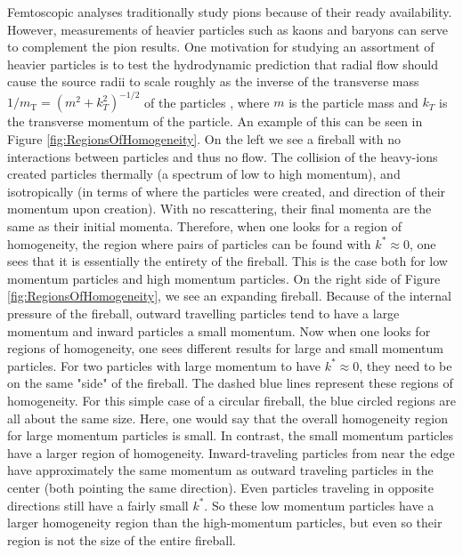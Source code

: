 Femtoscopic analyses traditionally study pions \cite{Goldhaber:1960sf,Aamodt:2011mr} because of their ready availability.  
However, measurements of heavier particles such as kaons \cite{Abelev:2012ms} and baryons \cite{Gos:2007cj} can serve to complement the pion results.  
One motivation for studying an assortment of heavier particles is to test the hydrodynamic prediction that radial flow should cause the source radii to scale roughly as the inverse of the transverse mass $1/m_{\mathrm{T}} = (m^2 + k^2_T)^{-1/2}$ of the particles \cite{Csorgo:1995bi,Lisa:2005dd}, where $m$ is the particle mass and $k_T$ is the transverse momentum of the particle.
An example of this can be seen in Figure \ref{fig:RegionsOfHomogeneity}.
On the left we see a fireball with no interactions between particles and thus no flow.
The collision of the heavy-ions created particles thermally (a spectrum of low to high momentum), and isotropically (in terms of where the particles were created, and direction of their momentum upon creation).
With no rescattering, their final momenta are the same as their initial momenta.
Therefore, when one looks for a region of homogeneity, the region where pairs of particles can be found with $k^* \approx 0$, one sees that it is essentially the entirety of the fireball.
This is the case both for low momentum particles and high momentum particles.
On the right side of Figure \ref{fig:RegionsOfHomogeneity}, we see an expanding fireball.
Because of the internal pressure of the fireball, outward travelling particles tend to have a large momentum and inward particles a small momentum.
Now when one looks for regions of homogeneity, one sees different results for large and small momentum particles.
For two particles with large momentum to have $k^* \approx 0$, they need to be on the same "side" of the fireball.
The dashed blue lines represent these regions of homogeneity.
For this simple case of a circular fireball, the blue circled regions are all about the same size.
Here, one would say that the overall homogeneity region for large momentum particles is small.
In contrast, the small momentum particles have a larger region of homogeneity.
Inward-traveling particles from near the edge have approximately the same momentum as outward traveling particles in the center (both pointing the same direction).
Even particles traveling in opposite directions still have a fairly small $k^*$.
So these low momentum particles have a larger homogeneity region than the high-momentum particles, but even so their region is not the size of the entire fireball.

